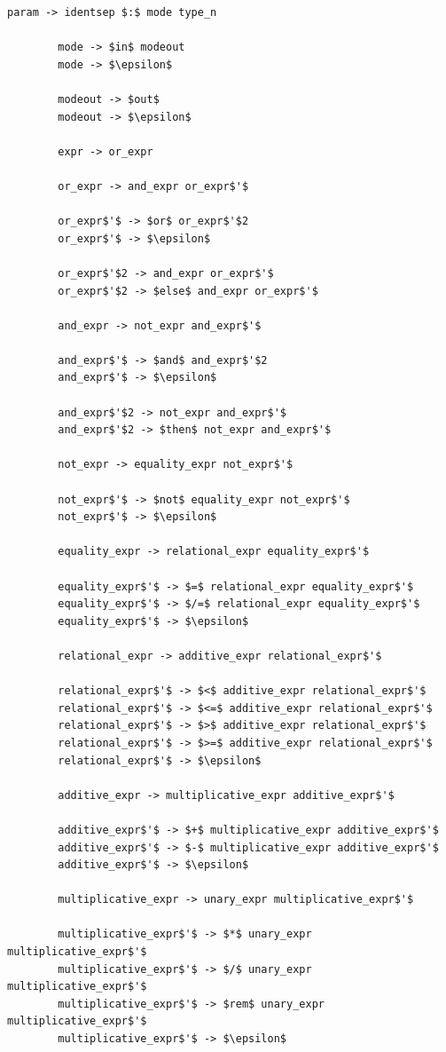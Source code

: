 \documentclass[french,a4paper]{article}
\begin{document}
\begin{lstlisting}[label={lst:lstlisting9}]
        param -> identsep $:$ mode type_n

        mode -> $in$ modeout
        mode -> $\epsilon$

        modeout -> $out$
        modeout -> $\epsilon$

        expr -> or_expr

        or_expr -> and_expr or_expr$'$

        or_expr$'$ -> $or$ or_expr$'$2
        or_expr$'$ -> $\epsilon$

        or_expr$'$2 -> and_expr or_expr$'$
        or_expr$'$2 -> $else$ and_expr or_expr$'$

        and_expr -> not_expr and_expr$'$

        and_expr$'$ -> $and$ and_expr$'$2
        and_expr$'$ -> $\epsilon$

        and_expr$'$2 -> not_expr and_expr$'$
        and_expr$'$2 -> $then$ not_expr and_expr$'$

        not_expr -> equality_expr not_expr$'$

        not_expr$'$ -> $not$ equality_expr not_expr$'$
        not_expr$'$ -> $\epsilon$

        equality_expr -> relational_expr equality_expr$'$

        equality_expr$'$ -> $=$ relational_expr equality_expr$'$
        equality_expr$'$ -> $/=$ relational_expr equality_expr$'$
        equality_expr$'$ -> $\epsilon$

        relational_expr -> additive_expr relational_expr$'$

        relational_expr$'$ -> $<$ additive_expr relational_expr$'$
        relational_expr$'$ -> $<=$ additive_expr relational_expr$'$
        relational_expr$'$ -> $>$ additive_expr relational_expr$'$
        relational_expr$'$ -> $>=$ additive_expr relational_expr$'$
        relational_expr$'$ -> $\epsilon$

        additive_expr -> multiplicative_expr additive_expr$'$

        additive_expr$'$ -> $+$ multiplicative_expr additive_expr$'$
        additive_expr$'$ -> $-$ multiplicative_expr additive_expr$'$
        additive_expr$'$ -> $\epsilon$

        multiplicative_expr -> unary_expr multiplicative_expr$'$

        multiplicative_expr$'$ -> $*$ unary_expr multiplicative_expr$'$
        multiplicative_expr$'$ -> $/$ unary_expr multiplicative_expr$'$
        multiplicative_expr$'$ -> $rem$ unary_expr multiplicative_expr$'$
        multiplicative_expr$'$ -> $\epsilon$


\end{lstlisting}
\end{document}
